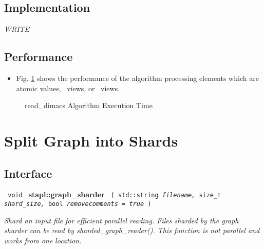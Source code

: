 \subsection{Implementation} \label{sec-read-dimacs-alg-impl}

\textit{WRITE}

\subsection{Performance} \label{sec-read-dimacs-alg-perf}

\begin{itemize}
\item
Fig. \ref{fig:rd-dimacs-alg-exec-exper}
shows the performance of the algorithm processing
elements which are atomic values, \stl\ views, or \stapl\ views.
\end{itemize}

\begin{figure}[p]
\caption{ read\_dimacs Algorithm Execution Time}
\label{fig:rd-dimacs-alg-exec-exper}
\end{figure}


\section{ Split Graph into Shards}
\label{sec-shard-graf-alg}

\subsection{Interface} \label{sec-shard-graf-alg-inter}

\noindent
\texttt{%
\newline
void 
}
\newline
\textbf{stapl::graph\_sharder}%
\newline
\texttt{%
(
std::string
\textit{filename,}%
size\_t
\textit{shard\_size,}%
bool
\textit{removecomments = true}%
)     
}
\vspace{0.4cm}

\textit{
Shard an input file for efficient parallel reading.
Files sharded by the graph sharder can be read by sharded\_graph\_reader(). 
This function is not parallel and works from one location.
}
\vspace{0.4cm}

